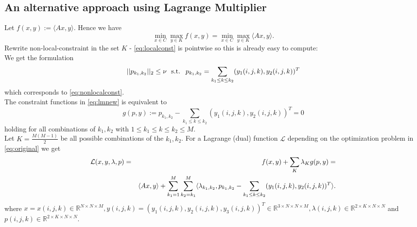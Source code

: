         \subsection{An alternative approach using Lagrange Multiplier}
            Let $f(x, y) := \langle Ax, y \rangle$. Hence we have
                \begin{equation}
                    \min_{x \in C} \max_{y \in K} f(x, y) = \min_{x \in C} \max_{y \in K} \langle Ax, y \rangle. \label{eq:original}
                \end{equation}
            Rewrite non-local-constraint in the set $K$ - \ref{eq:localconst} is pointwise so this is already easy to compute: \\
            We get the formulation
                \begin{equation}
                    ||p_{k_{1}, k_{2}}||_{2} \le \nu \,\,  \textnormal{ s.t. } \, \, p_{k_{1}, k_{2}} = \sum_{k_{1} \le k \le k_{2}} (y_{1}(i, j, k), y_{2}(i, j, k))^{T} \label{eq:lmnew}
                \end{equation}
            which corresponds to \ref{eq:nonlocalconst}. \\
            The constraint functions in \ref{eq:lmnew} is equivalent to
                \begin{equation}
                    g(p, y) := p_{k_{1}, k_{2}} - \sum_{k_{1} \le k \le k_{2}} (y_{1}(i, j, k), y_{2}(i, j, k))^{T} = 0 \label{eq:gofp}
                \end{equation}
            holding for all combinations of $k_{1}, k_{2}$ with $1 \le k_{1} \le k \le k_{2} \le M$. \\
            Let $K = \frac{M(M-1)}{2}$ be all possible combinations of the $k_{1}, k_{2}$. For a Lagrange (dual) function $\mathcal{L}$ depending on the optimization problem in \ref{eq:original} we get
                \begin{eqnarray}
                    \mathcal{L}(x, y, \lambda, p) &=& f(x, y) + \sum_{K} \lambda_{K} g(p, y) = \notag \\
                    &&\langle Ax, y \rangle + \sum_{k_{1} = 1}^{M} \sum_{k_{2} = k_{1}}^{M} \langle \lambda_{k_{1}, k_{2}}, p_{k_{1}, k_{2}} - \sum_{k_{1} \le k \le k_{2}} (y_{1}(i, j, k), y_{2}(i, j, k))^{T} \rangle.
                \end{eqnarray}
            where $x = x(i, j, k) \in \mathbb{R}^{N \times N \times M}, y(i, j, k) = (y_{1}(i, j, k), y_{2}(i, j, k), y_{3}(i, j, k))^{T} \in \mathbb{R}^{3 \times N \times N \times M}, \lambda(i, j, k) \in \mathbb{R}^{2 \times K \times N \times N}$ and $p(i, j, k) \in \mathbb{R}^{2 \times K \times N \times N}$. \\
